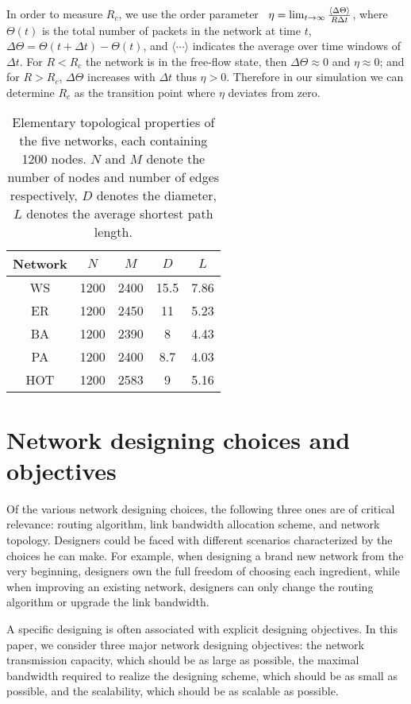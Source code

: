 \documentclass[journal]{IEEEtran}
\begin{document}
{In order to measure $R_c$, we use the order
parameter~\cite{Arenas01} $ \eta=\lim_{t\rightarrow \infty}{{\langle
\Delta\Theta \rangle} \over {R\Delta t} }$, where $\Theta(t)$ is the
total number of packets in the network at time $t$,
$\Delta\Theta=\Theta(t+\Delta t)-\Theta(t)$,  and
$\langle\cdots\rangle$ indicates the average over time windows of
$\Delta t$. For $R <R_c$ the network is in the free-flow state, then
$\Delta\Theta\approx0$ and $\eta\approx0$; and for $R>R_c$,
$\Delta\Theta$ increases with $\Delta t$ thus $\eta>0$. Therefore in
our simulation we can determine $R_c$ as the transition point where
$\eta$ deviates from zero.


\begin{table}[!t]
\renewcommand{\arraystretch}{1.3}
\centering
 \caption{Elementary topological properties of the five
networks, each containing 1200 nodes. $N$ and $M$ denote the number
of nodes and number of edges respectively, $D$ denotes the diameter,
$L$ denotes the average shortest path length. } \label{basic_info}
\begin{tabular}{ccccc}
\hline Network & $N$ & $M$ & $D$ & $L$
\\
\hline\hline
WS & 1200 & 2400 & 15.5 & 7.86 \\
ER & 1200 & 2450 & 11 & 5.23  \\
BA & 1200 & 2390 & 8 & 4.43  \\
PA & 1200 & 2400 & 8.7 & 4.03  \\
HOT & 1200 & 2583 & 9 & 5.16  \\
  \hline
\end{tabular}


\end{table}

\section{Network designing choices and
objectives}\label{designing-objective-choice}
Of the various network designing choices, the following three ones
are of critical relevance: routing algorithm, link bandwidth
allocation scheme, and network topology. Designers could be faced
with different scenarios characterized by the choices he can make.
For example, when designing a brand new network from the very
beginning, designers own the full freedom of choosing each
ingredient, while when improving an existing network, designers can
only change the routing algorithm or upgrade the link bandwidth.

A specific designing is often associated with explicit designing
objectives. In this paper, we consider three major network designing
objectives: the network transmission capacity, which should be as
large as possible, the maximal bandwidth required to realize the
designing scheme, which should be as small as possible, and the
scalability, which should be as scalable as possible.

}
\end{document}
